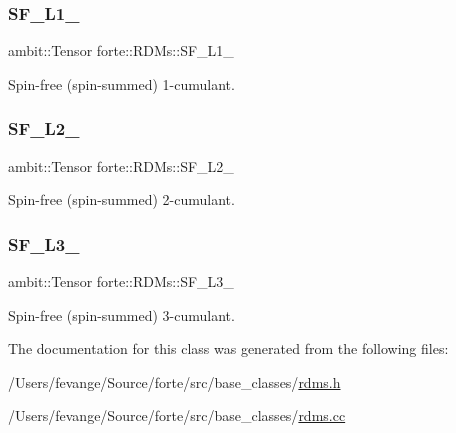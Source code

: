 \subsubsection{\texorpdfstring{S\+F\+\_\+\+L1\+\_\+}{SF\_L1\_}}
{\footnotesize\ttfamily ambit\+::\+Tensor forte\+::\+R\+D\+Ms\+::\+S\+F\+\_\+\+L1\+\_\+\hspace{0.3cm}{\ttfamily [protected]}}



Spin-\/free (spin-\/summed) 1-\/cumulant. 

\mbox{\label{classforte_1_1_r_d_ms_a2c32e3a99b64898be2e0a2de9071d110}} 
\subsubsection{\texorpdfstring{S\+F\+\_\+\+L2\+\_\+}{SF\_L2\_}}
{\footnotesize\ttfamily ambit\+::\+Tensor forte\+::\+R\+D\+Ms\+::\+S\+F\+\_\+\+L2\+\_\+\hspace{0.3cm}{\ttfamily [protected]}}



Spin-\/free (spin-\/summed) 2-\/cumulant. 

\mbox{\label{classforte_1_1_r_d_ms_a3347391ae477f8bcd2a17960c8721e11}} 
\subsubsection{\texorpdfstring{S\+F\+\_\+\+L3\+\_\+}{SF\_L3\_}}
{\footnotesize\ttfamily ambit\+::\+Tensor forte\+::\+R\+D\+Ms\+::\+S\+F\+\_\+\+L3\+\_\+\hspace{0.3cm}{\ttfamily [protected]}}



Spin-\/free (spin-\/summed) 3-\/cumulant. 



The documentation for this class was generated from the following files\+:\begin{DoxyCompactItemize}
\item 
/\+Users/fevange/\+Source/forte/src/base\+\_\+classes/\mbox{\hyperlink{rdms_8h}{rdms.\+h}}\item 
/\+Users/fevange/\+Source/forte/src/base\+\_\+classes/\mbox{\hyperlink{rdms_8cc}{rdms.\+cc}}\end{DoxyCompactItemize}
